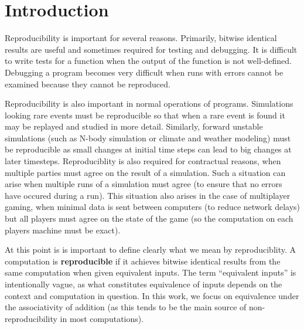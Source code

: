 \section{Introduction}
   
  Reproducibility is important for several reasons. Primarily, bitwise identical results are useful and sometimes required for testing and debugging. It is difficult to write tests for a function when the output of the function is not well-defined. Debugging a program becomes very difficult when runs with errors cannot be examined because they cannot be reproduced.

  Reproducibility is also important in normal operations of programs. Simulations looking rare events must be reproducible so that when a rare event is found it may be replayed and studied in more detail. Similarly, forward unstable simulations (such as N-body simulation or climate and weather modeling) must be reproducible as small changes at initial time steps can lead to big changes at later timesteps. Reproduciblity is also required for contractual reasons, when multiple parties must agree on the result of a simulation. Such a situation can arise when multiple runs of a simulation must agree (to ensure that no errors have occured during a run). This situation also arises in the case of multiplayer gaming, when minimal data is sent between computers (to reduce network delays) but all players must agree on the state of the game (so the computation on each players machine must be exact).

  At this point is is important to define clearly what we mean by reproduciblity. A computation is \textbf{reproducible} if it achieves bitwise identical results from the same computation when given equivalent inputs. The term ``equivalent inputs'' is intentionally vague, as what constitutes equivalence of inputs depends on the context and computation in question. In this work, we focus on equivalence under the associativity of addition (as this tends to be the main source of non-reproducibility in most computations). 

